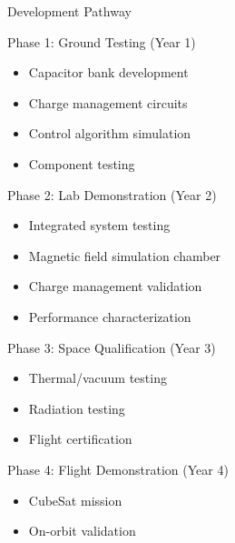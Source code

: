 \documentclass[aspectratio=169]{beamer}
\begin{document}
\begin{frame}{Development Pathway}
\begin{block}{Phase 1: Ground Testing (Year 1)}
\begin{itemize}
    \item Capacitor bank development
    \item Charge management circuits
    \item Control algorithm simulation
    \item Component testing
\end{itemize}
\end{block}

\begin{block}{Phase 2: Lab Demonstration (Year 2)}
\begin{itemize}
    \item Integrated system testing
    \item Magnetic field simulation chamber
    \item Charge management validation
    \item Performance characterization
\end{itemize}
\end{block}

\begin{block}{Phase 3: Space Qualification (Year 3)}
\begin{itemize}
    \item Thermal/vacuum testing
    \item Radiation testing
    \item Flight certification
\end{itemize}
\end{block}

\begin{block}{Phase 4: Flight Demonstration (Year 4)}
\begin{itemize}
    \item CubeSat mission
    \item On-orbit validation
\end{itemize}
\end{block}
\end{frame}
\end{document}
